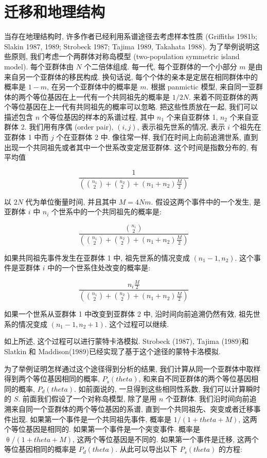 \documentclass[12pt]{article}
\begin{document}
\section{迁移和地理结构}

当存在地理结构时, 许多作者已经利用系谱途径去考虑样本性质 (Griffiths 1981b; Slakin 1987, 1989; Strobeck 1987;
Tajima 1989, Takahata 1988). 为了举例说明这些原则, 我们考虑一个两群体对称岛模型 (two-population symmetric
island model). 每个亚群体由 $N$ 个二倍体组成. 每一代, 每个亚群体的一个小部分 $m$ 是由来自另一个亚群体的移民构成.
换句话说, 每个个体的亲本是定居在相同群体中的概率是 $1-m$, 在另一个亚群体中的概率是 $m$. 根据 panmictic 模型,
来自同一亚群体的两个等位基因在上一代有一个共同祖先的概率是 $1/2N$.
来着不同亚群体的两个等位基因在上一代有共同祖先的概率可以忽略. 把这些性质放在一起, 我们可以描述包含 $n$
个等位基因的样本的系谱过程, 其中 $n_{1}$ 个来自亚群体 1, $n_{2}$ 个来自亚群体 2. 我们用有序偶 (order pair),
$(i,j)$, 表示祖先世系的情况, 表示 $i$ 个祖先在亚群体 1 中而 $j$ 个在亚群体 2 中. 像往常一样,
我们在时间上向前追溯世系, 直到出现一个共同祖先或者其中一个世系改变定居亚群体. 这个时间是指数分布的, 有平均值

\begin{equation*}
    \frac{1}{(\binom{n_1}{2}+\binom{n_2}{2}+(n_{1}+n_{2})\frac{M}{2})}
\end{equation*}

以 $2N$ 代为单位衡量时间, 并且其中 $M=4Nm$. 假设这两个事件中的一个发生, 是亚群体 $i$ 中 $n_{i}$
个世系中的一个共同祖先的概率是:

\begin{equation*}
    \frac{\binom{n_i}{2}}{(\binom{n_1}{2}+\binom{n_2}{2}+(n_{1}+n_{2})\frac{M}{2})}
\end{equation*}

如果共同祖先事件发生在亚群体 1 中, 祖先世系的情况变成 $(n_{1}-1,n_{2})$. 这个事件是亚群体 $i$
中的一个世系住处改变的概率是:

\begin{equation*}
    \frac{n_{i}\frac{M}{2}}{(\binom{n_1}{2} + \binom{n_2}{2} + (n_{1}+n_{2})\frac{M}{2})}
\end{equation*}

如果一个世系从亚群体 1 中改变到亚群体 2 中, 沿时间向前追溯仍然有效, 祖先世系的情况变成 $(n_{1}-1,n_{2}+1)$.
这个过程可以继续.

如上所述, 这个过程可以进行蒙特卡洛模拟. Strobeck (1987), Tajima (1989)和 Slatkin 和
Maddison(1989)已经实现了基于这个途径的蒙特卡洛模拟.

为了举例证明怎样通过这个途径得到分析的结果, 我们计算从同一个亚群体中取样得到两个等位基因相同的概率, $P_{s}(theta )$,
和来自不同亚群体的两个等位基因相同的概率, $P_{d}(theta )$. 如前面说的, 一旦得到这些相同性系数, 我们可以计算瞬时的 $S$.
前面我们假设了一个对称岛模型, 除了是用 $n$ 个亚群体. 我们沿时间向前追溯来自同一个亚群体的两个等位基因的系谱,
直到一个共同祖先、突变或者迁移事件出现. 如果第一个事件是一个共同祖先事件, 概率是 $1/(1+theta +M)$,
这两个等位基因是相同的. 如果第一个事件是一个突变事件. 概率是 $\uptheta /(1+theta +M)$, 这两个等位基因是不同的.
如果第一个事件是迁移, 这两个等位基因相同的概率是 $P_{d}(theta )$. 从此可以导出以下 $P_{s}(theta )$ 的方程:
\end{document}
